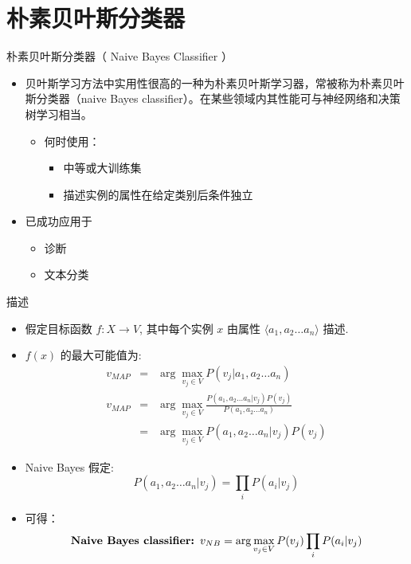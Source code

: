 \documentclass[presentation]{beamer}
\begin{document}
\section{朴素贝叶斯分类器}
\label{sec:orgb6775b0}
\begin{frame}[label={sec:org1a1bc6e}]{朴素贝叶斯分类器（ Naive Bayes Classifier ）}
\begin{itemize}
\item 贝叶斯学习方法中实用性很高的一种为朴素贝叶斯学习器，常被称为朴素贝叶斯分类器（naive Bayes classifier）。在某些领域内其性能可与神经网络和决策树学习相当。
\begin{itemize}
\item 何时使用：
\begin{itemize}
\item 中等或大训练集
\item 描述实例的属性在给定类别后条件独立
\end{itemize}
\end{itemize}
\item 已成功应用于
\begin{itemize}
\item 诊断
\item 文本分类
\end{itemize}
\end{itemize}
\end{frame}
\begin{frame}[label={sec:orgbc1983f}]{描述}
\begin{itemize}
\item 假定目标函数 \(f: X \rightarrow V\), 其中每个实例 \(x\) 由属性 \(\langle a_{1}, a_{2} \ldots a_{n} \rangle\) 描述.
\item \(f(x)\) 的最大可能值为:
\begin{eqnarray}
v_{MAP} &= &\arg \max_{v_{j} \in V} P(v_{j} | a_{1}, a_{2} \ldots a_{n})  \nonumber \\ 
v_{MAP} &= &\arg \max_{v_{j} \in V} \frac{P(a_{1}, a_{2} \ldots a_{n}|v_{j})
P(v_{j})}{P(a_{1}, a_{2} \ldots a_{n})} \nonumber \\ 
&= &\arg \max_{v_{j} \in V} P(a_{1}, a_{2} \ldots a_{n}|v_{j}) P(v_{j}) \nonumber
\end{eqnarray}
\item Naive Bayes 假定:
\[ P(a_{1}, a_{2} \ldots a_{n}|v_{j}) = \prod_{i} P(a_{i} | v_{j}) \]
\item 可得： 
\[\mbox{\bf Naive Bayes classifier: } v_{NB} = \arg \max_{v_{j} \in V} P(v_{j})\prod_{i} P(a_{i} | v_{j}) \]
\end{itemize}
\end{frame}
\end{document}
